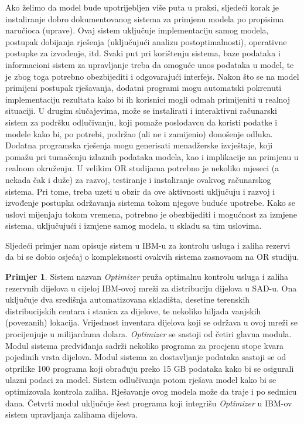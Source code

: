 \documentclass[a4paper, utf8, 11pt, colorlinks]{book}
\theoremstyle{definition}
\newtheorem{primjer}{Primjer}[chapter]
\begin{document}
Ako želimo da model bude upotrijebljen više puta u praksi, sljedeći  korak je instaliranje dobro dokumentovanog sistema za primjenu modela po propisima naručioca (uprave). Ovaj sistem uključuje implementaciju samog modela, postupak dobijanja rješenja (uključujući analizu postoptimalnosti), operativne postupke za izvođenje, itd. %
Svaki put pri korištenju sistema, baze podataka i informacioni sistem za upravljanje treba da omoguće unos podataka u model, te je zbog toga potrebno obezbijediti i odgovarajući interfejs. Nakon što se na model primijeni postupak rješavanja, dodatni  programi mogu automatski pokrenuti implementaciju rezultata kako bi ih korisnici mogli odmah primijeniti u realnoj situaciji. U drugim slučajevima, može se instalirati i interaktivni računarski sistem  za podršku odlučivanju, koji pomaže poslodavcu da koristi podatke i modele kako bi, po potrebi, podržao (ali ne i zamijenio)   donošenje odluka. Dodatna programska rješenja mogu generisati menadžerske izvještaje, koji pomažu pri tumačenju izlaznih podataka modela, kao i implikacije na primjenu u realnom okruženju.  U velikim OR studijama potrebno je nekoliko mjeseci (a nekada čak i duže) za razvoj, testiranje i instaliranje ovakvog računarskog sistema. Pri tome, treba uzeti u obzir da ove aktivnosti uključuju i razvoj i izvođenje postupka održavanja sistema  tokom njegove buduće upotrebe. Kako se uslovi mijenjaju tokom vremena, potrebno je obezbijediti i mogućnost za  izmjene sistema, uključujući i izmjene samog modela, u skladu sa tim uslovima.  

Sljedeći primjer nam opisuje sistem u IBM-u za kontrolu usluga i zaliha rezervi da bi se dobio osjećaj o kompleksnosti ovakvih sistema zasnovaom na OR studiju. 

\begin{primjer}\label{primjer:IMBOptimizer}
Sistem nazvan \emph{Optimizer} pruža optimalnu kontrolu usluga i zaliha rezervnih dijelova u cijeloj IBM-ovoj mreži za distribuciju dijelova u SAD-u. Ona uključuje dva središnja
automatizovana skladišta, desetine terenskih distribucijskih centara i stanica za dijelove, te nekoliko hiljada vanjskih (povezanih) lokacija. Vrijednost inventara dijelova koji se održava u ovoj mreži se procijenjuje u milijardama dolara. \emph{Optimizer} se sastoji od četiri glavna modula. Modul sistema predviđanja sadrži nekoliko programa za procjenu stope kvara pojedinih vrsta dijelova. Modul sistema za dostavljanje podataka sastoji se od otprilike 100 programa koji    obrađuju
preko 15 GB podataka kako bi se osigurali ulazni podaci za model. Sistem odlučivanja potom rješava model kako bi se optimizovala kontrola zaliha. Rješavanje ovog modela može da traje i po sedmicu dana. Četvrti modul uključuje šest programa koji integrišu \emph{Optimizer} u IBM-ov sistem upravljanja zalihama dijelova. %
\end{primjer} 
\end{document}
